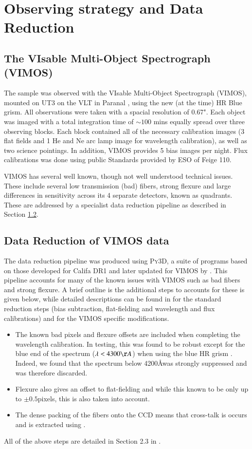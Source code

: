 \documentclass[fleqn,usenatbib,useAMS]{mnras}
\begin{document}
\section{Observing strategy and Data Reduction}
	\label{sec:obs}
	\subsection{The VIsable Multi-Object Spectrograph (VIMOS)}
		\label{subsec:VIMOS}
		The sample was observed with the VIsable Multi-Object Spectrograph (VIMOS), mounted on UT3 on the VLT in Paranal \citep{LeFevre2003}, using the new (at the time) HR Blue grism. All observations were taken with a spacial resolution of 0.67". Each object was imaged with a total integration time of $\sim 100$ mins equally spread over three observing blocks. Each block contained all of the necessary calibration images (3 flat fields and 1 He and Ne arc lamp image for wavelength calibration), as well as two science pointings. In addition, VIMOS provides 5 bias images per night. Flux calibrations was done using public Standards provided by ESO of Feige 110.

		VIMOS has several well known, though not well understood technical issues. These include several low transmission (bad) fibers, strong flexure and large differences in sensitivity across its 4 separate detectors, known as quadrants. These are addressed by a specialist data reduction pipeline as described in Section \ref{subsec:reduct}. 

	\subsection{Data Reduction of VIMOS data}
		\label{subsec:reduct}
		The data reduction pipeline was produced using \textsc{Py3D}, a suite of programs based on those developed for Califa DR1 \citep{Sanchez2011, Husemann2013} and later updated for VIMOS by \citet{Husemann2014}. This pipeline accounts for many of the known issues with VIMOS such as bad fibers and strong flexure. A brief outline is the additional steps to accounts for these is given below, while detailed descriptions can be found in \citet{Sanchez2011} for the standard reduction steps (bias subtraction, flat-fielding and wavelength and flux calibrations) and \citep{Husemann2014} for the VIMOS specific modifications. 
		\begin{itemize}
		\item The known bad pixels and flexure offsets are included when completing the wavelength calibration. In testing, this was found to be robust except for the blue end of the spectrum ($\lambda < 4300 \AA$) when using the blue HR grism \citep{Husemann2014}. Indeed, we found that the spectrum below 4200\AA was strongly suppressed and was therefore discarded.
		\item Flexure also gives an offset to flat-fielding and while this known to be only up to $\pm0.5$pixels, this is also taken into account.
		\item The dense packing of the fibers onto the CCD means that cross-talk is occurs and is extracted using \citep{Horne1986}. 
		\end{itemize}
		All of the above steps are detailed in Section 2.3 in \citet{Husemann2014}.
\end{document}
